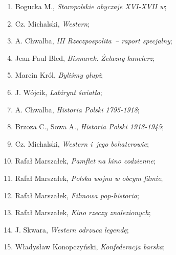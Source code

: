 \documentclass[a4paper,11pt]{article}
\begin{document}
\begin{enumerate}
\item Bogucka M., \textit{Staropolskie obyczaje XVI-XVII w};



\item Cz. Michalski, \textit{Western};



\item A. Chwalba, \textit{III Rzeczpospolita~-- raport specjalny};



\item Jean-Paul Bled, \textit{Bismarck. Żelazny kanclerz};



\item Marcin Król, \textit{Byliśmy głupi};



\item J. Wójcik, \textit{Labirynt światła};



\item A. Chwalba, \textit{Historia Polski 1795-1918};



\item Brzoza C., Sowa A., \textit{Historia Polski 1918-1945};



\item Cz. Michalski, \textit{Western i~jego bohaterowie};



\item Rafał Marszałek, \textit{Pamflet na kino codzienne};



\item Rafał Marszałek, \textit{Polska wojna w obcym filmie};



\item Rafał Marszałek, \textit{Filmowa pop-historia};



\item Rafał Marszałek, \textit{Kino rzeczy znalezionych};



\item J. Skwara, \textit{Western odrzuca legendę};



\item Władysław Konopczyński, \textit{Konfederacja barska};




\end{enumerate}
\end{document}

